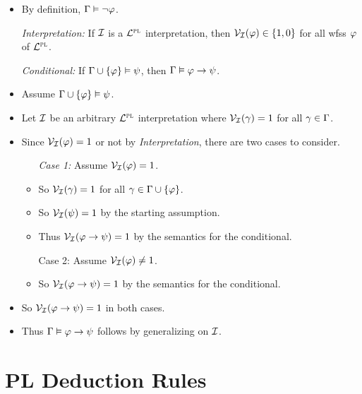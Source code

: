\documentclass[a4paper, 11pt]{article} %
\begin{document}
\begin{itemize}
    \item By definition, $\Gamma \vDash \neg\varphi$.
  \item[\it Interpretation:] If $\mathcal{I}$ is a $\mathcal{L}^{\textsc{pl}}$ interpretation, then $\mathcal{V}_{\mathcal{I}}(\varphi) \in \lbrace1,0\rbrace$ for all wfss $\varphi$ of $\mathcal{L}^{\textsc{pl}}$. 
  \item[\it Conditional:] If $\Gamma \cup \lbrace\varphi\rbrace \vDash \psi$, then $\Gamma \vDash \varphi \rightarrow \psi$.
    \item Assume $\Gamma \cup \lbrace\varphi\rbrace \vDash \psi$.
    \item Let $\mathcal{I}$ be an arbitrary $\mathcal{L}^{\textsc{pl}}$ interpretation where $\mathcal{V}_{\mathcal{I}}(\gamma) = 1$ for all $\gamma \in \Gamma$.
    \item Since $\mathcal{V}_{\mathcal{I}}(\varphi) = 1$ or not by \textit{Interpretation}, there are two cases to consider. 
    \begin{itemize}
      \item[\it Case 1:] Assume $\mathcal{V}_{\mathcal{I}}(\varphi) = 1$.
        \item So $\mathcal{V}_{\mathcal{I}}(\gamma) = 1$ for all $\gamma \in \Gamma \cup \lbrace\varphi\rbrace$.
        \item So $\mathcal{V}_{\mathcal{I}}(\psi) = 1$ by the starting assumption.
        \item Thus $\mathcal{V}_{\mathcal{I}}(\varphi \rightarrow \psi) = 1$ by the semantics for the conditional.
      \item[Case 2:] Assume $\mathcal{V}_{\mathcal{I}}(\varphi) \neq 1$.
        \item So $\mathcal{V}_{\mathcal{I}}(\varphi \rightarrow \psi) = 1$ by the semantics for the conditional.
    \end{itemize}
    \item So $\mathcal{V}_{\mathcal{I}}(\varphi \rightarrow \psi) = 1$ in both cases.
    \item Thus $\Gamma \vDash \varphi \rightarrow \psi$ follows by generalizing on $\mathcal{I}$. 
\end{itemize}




\section*{PL Deduction Rules}
\end{document}
